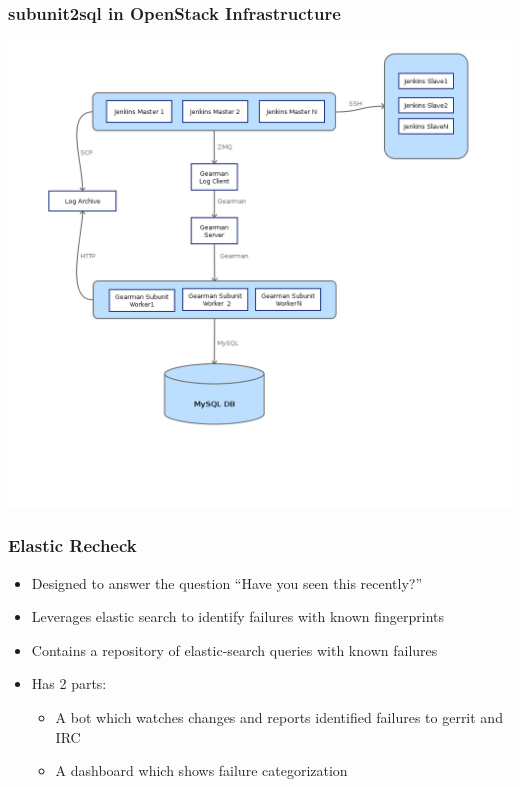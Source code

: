 \documentclass[aspectratio=43,11pt,hyperref={colorlinks=true}]{beamer}
\begin{document}
\begin{frame}
    \frametitle{subunit2sql in OpenStack Infrastructure}
    \begin{center}
        \includegraphics[height=1.0\textheight]{subunit2sql-collection.png}
    \end{center}
\end{frame}

\begin{frame}
  \frametitle{Elastic Recheck}
  \begin{itemize}
    \item Designed to answer the question ``Have you seen this recently?''
    \item Leverages elastic search to identify failures with known fingerprints
    \item Contains a repository of elastic-search queries with known failures
    \item Has 2 parts:
        \begin{itemize}
            \item A bot which watches changes and reports identified failures to gerrit and IRC
            \item A dashboard which shows failure categorization
        \end{itemize}
    \end{itemize}
\end{frame}
\end{document}
